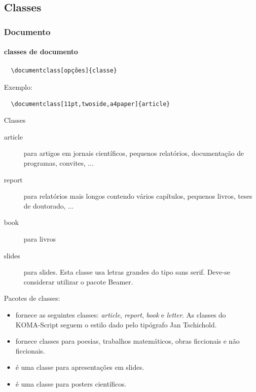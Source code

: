 \subsection{Classes}
\begin{frame}
\frametitle{Documento}
\framesubtitle{classes de documento}
  \begin{verbatim}
  \documentclass[opções]{classe}
  \end{verbatim}
  Exemplo:
  \begin{verbatim}
  \documentclass[11pt,twoside,a4paper]{article}
  \end{verbatim}

  Classes
  \begin{description}
  \item[article] para artigos em jornais científicos, pequenos relatórios, documentação de programas, convites, ...
  \item[report] para relatórios mais longos contendo vários capítulos, pequenos livros, teses de doutorado, ...  
  \item[book] para livros
  \item[slides] para slides. Esta classe usa letras grandes do tipo sans serif. Deve-se
       considerar utilizar o pacote Beamer.
  \end{description}

  \framebreak
  Pacotes de classes:
  \begin{itemize}
  \item {} fornece as seguintes classes: \emph{article}, \emph{report}, \emph{book} e \emph{letter}.
    As classes do KOMA-Script seguem o estilo dado pelo tipógrafo Jan Tschichold.
  \item {} fornece classes para poesias, trabalhos matemáticos, obras ficcionais e não ficcionais.
  \item {} é uma classe para apresentações em slides.
  \item {} é uma classe para posters científicos.
  \end{itemize}

\end{frame}

